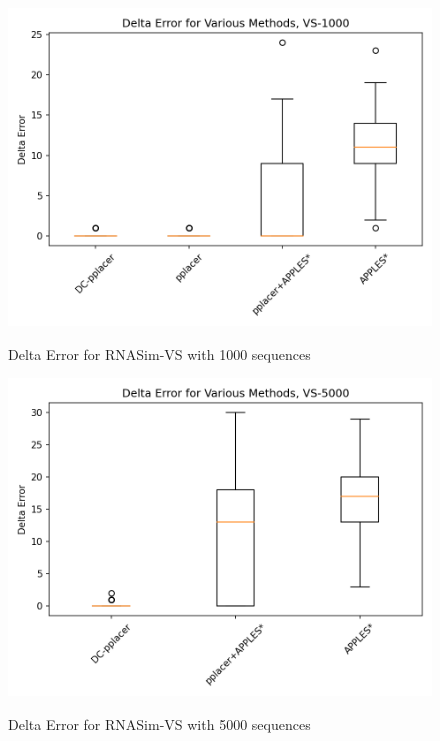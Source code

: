 \documentclass[10pt]{article}
\begin{document}
\begin{figure}[h]
\centering
\includegraphics[width=\textwidth]{Figs/VS-delta-error-1000.png}
\label{fig:error1000}
\caption{Delta Error for RNASim-VS with 1000 sequences}
\end{figure}

\begin{figure}[h]
\centering
\includegraphics[width=\textwidth]{Figs/VS-delta-error-5000.png}
\label{fig:error5000}
\caption{Delta Error for RNASim-VS with 5000 sequences}
\end{figure}
\end{document}
